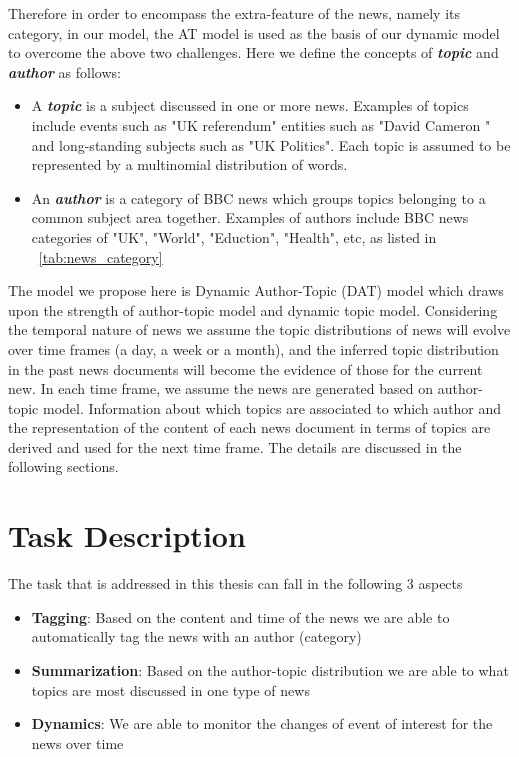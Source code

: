 Therefore in order to encompass the extra-feature of the news, namely its category, in our model, the AT model is used as the basis of our dynamic model to overcome the above two challenges. Here we define the concepts of \textbf{\textit{topic}} and \textbf{\textit{author}} as follows: 
\begin{itemize}
  \item A \textbf{\textit{topic}} is a subject discussed in one or more news. Examples of topics include events such as "UK referendum" entities such as "David Cameron " and long-standing subjects such as "UK Politics". Each topic is assumed to be represented by a multinomial distribution of words.
  \item An \textbf{\textit{author}} is a category of BBC news which groups topics belonging to a common subject
  area together. Examples of authors include BBC news categories of "UK", "World", "Eduction", "Health", etc, as listed in ~\ref{tab:news_category}
  \end{itemize}
The model we propose here is Dynamic Author-Topic (DAT) model which draws upon the strength of author-topic model and dynamic topic model. Considering the temporal nature of news we assume the topic distributions of news will evolve over time frames (a day, a week or a month), and the inferred topic distribution in the past news documents will become the evidence of those for the current new. In each time frame, we assume the news are generated based on author-topic model. Information about which topics are associated to which author and the representation of the content of each news document in terms of topics are derived and used for the next time frame. The details are discussed in the following sections.

\section{Task Description}\label{taskdescription}
The task that is addressed in this thesis can fall in the following 3 aspects

\begin{itemize}
  \item \textbf{Tagging}: Based on the content and time of the news we are able to automatically tag the news with an author (category)
  \item \textbf{Summarization}: Based on the author-topic distribution we are able to what topics are most discussed in one type of news
  \item \textbf{Dynamics}: We are able to monitor the changes of event of interest for the news over time
\end{itemize}

